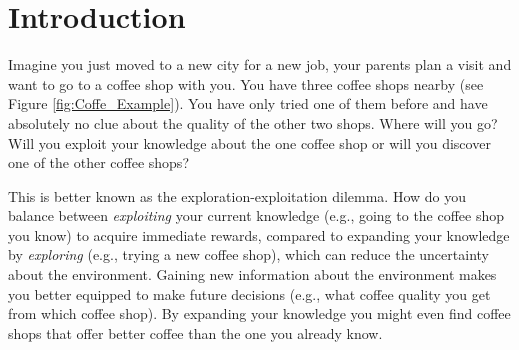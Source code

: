 %
\chapter{Introduction}
Imagine you just moved to a new city for a new job, your parents plan a visit and want to go to a coffee shop with you. You have three coffee shops nearby (see Figure \ref{fig:Coffe_Example}). You have only tried one of them before and have absolutely no clue about the quality of the other two shops. Where will you go? Will you exploit your knowledge about the one coffee shop or will you discover one of the other coffee shops?

This is better known as the exploration-exploitation dilemma. How do you balance between \textit{exploiting} your current knowledge (e.g., going to the coffee shop you know) to acquire immediate rewards, compared to expanding your knowledge by \textit{exploring} (e.g., trying a new coffee shop), which can reduce the uncertainty about the environment. %
Gaining new information about the environment makes you better equipped to make future decisions (e.g., what coffee quality you get from which coffee shop). By expanding your knowledge you might even find coffee shops that offer better coffee than the one you already know.   %


